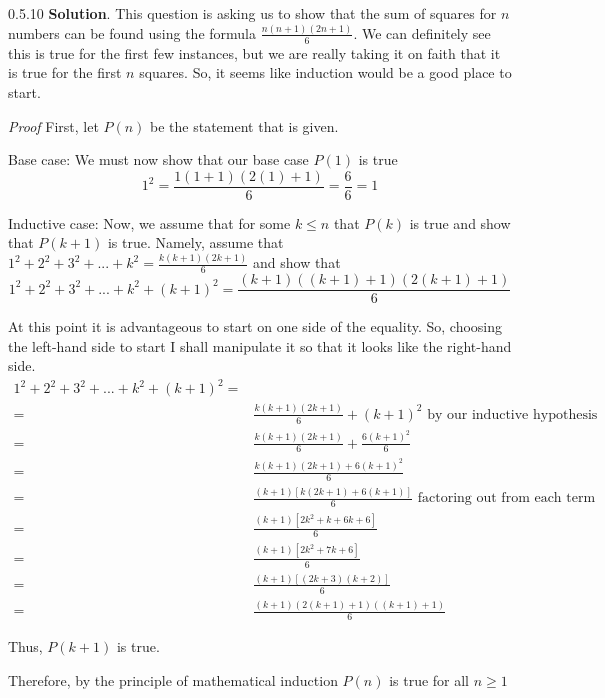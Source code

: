 \documentclass[11pt,]{book}
\makeatletter
\theoremstyle{ptxplainnotitle}
\theoremstyle{ptxplaintitle}
\renewcommand*{\proofname}{Proof}
\renewenvironment{proof}[1][\proofname]{\par
  \pushQED{\qed}%
  \normalfont \topsep6\p@\@plus6\p@\relax
  \trivlist
  \item\relax
    {\itshape
    #1\@addpunct{.}}\hspace\labelsep\ignorespaces
}{%
  \popQED\endtrivlist\@endpefalse
}
\theoremstyle{ptxdefinitionnotitle}
\theoremstyle{ptxdefinitiontitle}
\theoremstyle{ptxdefinitionnotitle}
\theoremstyle{ptxdefinitiontitle}
\theoremstyle{ptxdefinitionnotitle}
\theoremstyle{ptxdefinitiontitle}
\theoremstyle{ptxdefinitiontitlenonumber}
\theoremstyle{ptxdefinitiontitlenonumber}
\numberwithin{equation}{chapter}
\newcommand{\amp}{&}
\makeatother
\begin{document}
\begin{divisionexercise}{0.5.10}
\textbf{Solution}.\quad%
\hypertarget{p-644}{}%
This question is asking us to show that the sum of squares for \(n\) numbers can be found using the formula \(\frac{n(n+1)(2n+1)}{6}\). We can definitely see this is true for the first few instances, but we are really taking it on faith that it is true for the first \(n\) squares. So, it seems like induction would be a good place to start.%
\begin{proof}\hypertarget{proof-12}{}
\hypertarget{p-645}{}%
First, let \(P(n)\) be the statement that is given.%
\par
\hypertarget{p-646}{}%
Base case: We must now show that our base case \(P(1)\) is true%
\begin{equation*}
1^2 = \frac{1(1+1)(2(1)+1)}{6} = \frac{6}{6} =1
\end{equation*}
%
\par
\hypertarget{p-647}{}%
Inductive case: Now, we assume that for some \(k\leq n\) that \(P(k)\) is true and show that \(P(k+1)\) is true. Namely, assume that \(1^2 +2^2 +3^2+...+k^2 = \frac{k(k+1)(2k+1)}{6}\) and show that%
\begin{equation*}
1^2 +2^2 +3^2+...+k^2+{(k+1)}^2 = \frac{(k+1)((k+1)+1)(2(k+1)+1)}{6}
\end{equation*}
%
\par
\hypertarget{p-648}{}%
At this point it is advantageous to start on one side of the equality. So, choosing the left-hand side to start I shall manipulate it so that it looks like the right-hand side.%
\begin{align*}
1^2 +2^2 +3^2+...+k^2+{(k+1)}^2 =\\
= \amp \frac{k(k+1)(2k+1)}{6} +(k+1)^2 \mbox{ by our inductive hypothesis}\\
= \amp \frac{k(k+1)(2k+1)}{6} +\frac{6(k+1)^2}{6}\\
= \amp \frac{k(k+1)(2k+1)+6(k+1)^2}{6}\\
= \amp \frac{(k+1)[k(2k+1)+6(k+1)]}{6} \mbox{ factoring out  from each term}\\
= \amp \frac{(k+1)[2k^2+k+6k+6]}{6}\\
= \amp \frac{(k+1)[2k^2+7k+6]}{6}\\
= \amp \frac{(k+1)[(2k+3)(k+2)]}{6}\\
= \amp \frac{(k+1)(2(k+1)+1)((k+1)+1)}{6}
\end{align*}
%
\par
\hypertarget{p-649}{}%
Thus, \(P(k+1)\) is true.%
\par
\hypertarget{p-650}{}%
Therefore, by the principle of mathematical induction \(P(n)\) is true for all \(n \geq 1\)%
\end{proof}
\end{divisionexercise}%
\end{document}
